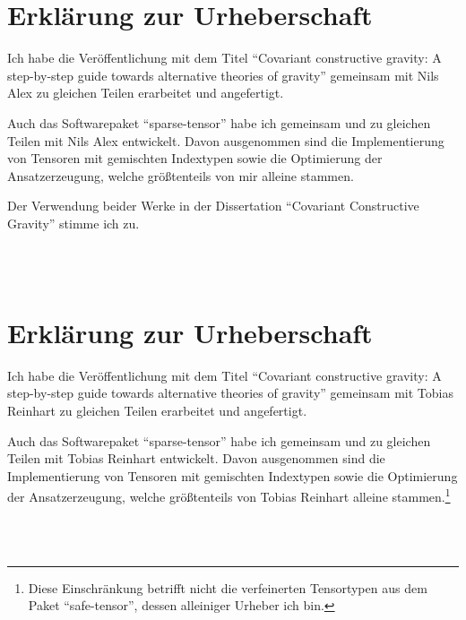 \documentclass[%
english,
12pt,
twoside=false,
headsepline,
numbers=noenddot,
parskip=half,
a4paper,
final
]{scrarticle}
\begin{document}
\section*{Erklärung zur Urheberschaft}

Ich habe die Veröffentlichung mit dem Titel \enquote{Covariant constructive gravity: A step-by-step guide towards alternative theories of gravity} \cite{Alex_2020} gemeinsam mit Nils Alex zu gleichen Teilen erarbeitet und angefertigt.

Auch das Softwarepaket \enquote{sparse-tensor} \cite{Reinhart_2019_sparse-tensor} habe ich gemeinsam und zu gleichen Teilen mit Nils Alex entwickelt. Davon ausgenommen sind die Implementierung von Tensoren mit gemischten Indextypen sowie die Optimierung der Ansatzerzeugung, welche größtenteils von mir alleine stammen.

Der Verwendung beider Werke in der Dissertation \enquote{Covariant Constructive Gravity} stimme ich zu.

\printbibliography[heading=none]

\vspace{1cm}

\begin{flushleft}
\makebox[.4\textwidth]{\hrulefill}\hfill \makebox[.4\textwidth]{\hrulefill}\\
\hfill
{}\\
\end{flushleft}

\newpage
\section*{Erklärung zur Urheberschaft}

Ich habe die Veröffentlichung mit dem Titel \enquote{Covariant constructive gravity: A step-by-step guide towards alternative theories of gravity} \cite{Alex_2020} gemeinsam mit Tobias Reinhart zu gleichen Teilen erarbeitet und angefertigt.

Auch das Softwarepaket \enquote{sparse-tensor} \cite{Reinhart_2019_sparse-tensor} habe ich gemeinsam und zu gleichen Teilen mit Tobias Reinhart entwickelt. Davon ausgenommen sind die Implementierung von Tensoren mit gemischten Indextypen sowie die Optimierung der Ansatzerzeugung, welche größtenteils von Tobias Reinhart alleine stammen.\footnote{Diese Einschränkung betrifft nicht die verfeinerten Tensortypen aus dem Paket \enquote{safe-tensor}, dessen alleiniger Urheber ich bin.}

\printbibliography[heading=none]

\vspace{1cm}

\begin{flushleft}
\makebox[.4\textwidth]{\hrulefill}\hfill \makebox[.4\textwidth]{\hrulefill}\\
\hfill
{}\\
\end{flushleft}
\end{document}
